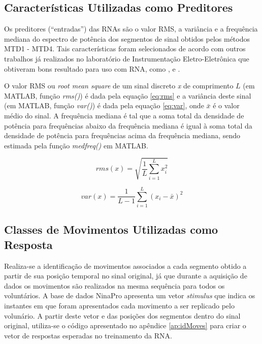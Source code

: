 

			\subsection{Características Utilizadas como Preditores}
Os preditores (``entradas'') das RNAs são o valor RMS, a variância e a frequência mediana do espectro de potência dos segmentos de sinal obtidos pelos métodos MTD1 - MTD4. Tais características foram selecionados de acordo com outros trabalhos já realizados no laboratório de Instrumentação Eletro-Eletrônica que obtiveram bons resultado para uso com RNA, como \cite{Favieiro2009}, \cite{Schons2014} e \cite{Cene2015}.

O valor RMS ou \emph{root mean square} de um sinal discreto \emph{x} de comprimento $L$ (em MATLAB, função \emph{rms()}) é dada pela equação \ref{eq:rms} e a variância deste sinal (em MATLAB, função \emph{var()}) é dada pela equação \ref{eq:var}, onde $\bar{x}$ é o valor médio do sinal. A frequência mediana é tal que a soma total da densidade de potência para frequências abaixo da frequência mediana é igual à soma total da densidade de potência para frequências acima da frequência mediana, sendo estimada pela função \emph{medfreq()} em MATLAB.

\begin{equation}
	\label{eq:rms}
	rms(x) = \sqrt{\frac{1}{L}\sum\limits_{i=1}^{L}x_i^2} 
\end{equation}

\begin{equation}
	\label{eq:var}
	var(x) = \frac{1}{L-1}\sum\limits_{i=1}^{L}(x_i - \bar{x})^2
\end{equation}

			\subsection{Classes de Movimentos Utilizadas como Resposta}
Realiza-se a identificação de movimentos associados a cada segmento obtido a partir de sua posição temporal no sinal original, já que durante a aquisição de dados os movimentos são realizados na mesma sequência para todos os voluntários. A base de dados NinaPro apresenta um vetor \emph{stimulus} que indica os instantes em que foram apresentados cada movimento a ser replicado pelo volunário. A partir deste vetor e das posições dos segmentos dentro do sinal original, utiliza-se o código apresentado no apêndice \ref{ap:idMoves} para criar o vetor de respostas esperadas no treinamento da RNA.

